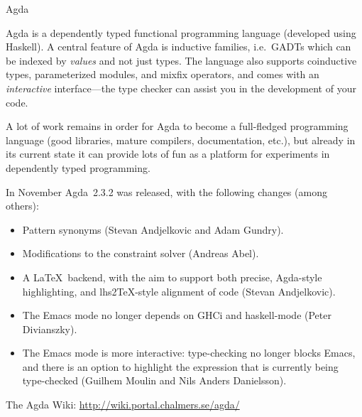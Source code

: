 \documentclass{article}
\begin{document}
\begin{hcarentry}{Agda}
\label{agda}
\makeheader

Agda is a dependently typed functional programming language (developed
using Haskell). A central feature of Agda is inductive families,
i.e.\ GADTs which can be indexed by \emph{values} and not just types.
The language also supports coinductive types, parameterized modules,
and mixfix operators, and comes with an \emph{interactive}
interface---the type checker can assist you in the development of your
code.

A lot of work remains in order for Agda to become a full-fledged
programming language (good libraries, mature compilers, documentation,
etc.), but already in its current state it can provide lots of fun as
a platform for experiments in dependently typed programming.

In November Agda~2.3.2 was released, with the following changes (among
others):
\begin{itemize}
\item Pattern synonyms (Stevan Andjelkovic and Adam Gundry).
\item Modifications to the constraint solver (Andreas Abel).
\item A \LaTeX\ backend, with the aim to support both precise,
  Agda-style highlighting, and lhs2TeX-style alignment of code (Stevan
  Andjelkovic).
\item The Emacs mode no longer depends on GHCi and haskell-mode (Peter
  Divianszky).
\item The Emacs mode is more interactive: type-checking no longer
  blocks Emacs, and there is an option to highlight the expression
  that is currently being type-checked (Guilhem Moulin and Nils Anders
  Danielsson).
\end{itemize}

\FurtherReading
  The Agda Wiki: \url{http://wiki.portal.chalmers.se/agda/}
\end{hcarentry}
\end{document}
